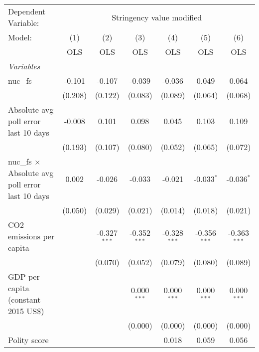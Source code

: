 
\begingroup
\centering
\begin{tabular}{lcccccc}
   \toprule
   Dependent Variable: & \multicolumn{6}{c}{Stringency value modified}\\
   Model:                                                  & (1)     & (2)            & (3)            & (4)            & (5)            & (6)\\  
                                                           &  OLS    & OLS            & OLS            & OLS            & OLS            & OLS\\  
   \midrule
   \emph{Variables}\\
   nuc\_fs                                                 & -0.101  & -0.107         & -0.039         & -0.036         & 0.049          & 0.064\\   
                                                           & (0.208) & (0.122)        & (0.083)        & (0.089)        & (0.064)        & (0.068)\\   
   Absolute avg poll error last 10 days                    & -0.008  & 0.101          & 0.098          & 0.045          & 0.103          & 0.109\\   
                                                           & (0.193) & (0.107)        & (0.080)        & (0.052)        & (0.065)        & (0.072)\\   
   nuc\_fs $\times$ Absolute avg poll error last 10 days   & 0.002   & -0.026         & -0.033         & -0.021         & -0.033$^{*}$   & -0.036$^{*}$\\   
                                                           & (0.050) & (0.029)        & (0.021)        & (0.014)        & (0.018)        & (0.021)\\   
   CO2 emissions per capita                                &         & -0.327$^{***}$ & -0.352$^{***}$ & -0.328$^{***}$ & -0.356$^{***}$ & -0.363$^{***}$\\   
                                                           &         & (0.070)        & (0.052)        & (0.079)        & (0.080)        & (0.089)\\   
   GDP per capita (constant 2015 US\$)                     &         &                & 0.000$^{***}$  & 0.000$^{***}$  & 0.000$^{***}$  & 0.000$^{***}$\\   
                                                           &         &                & (0.000)        & (0.000)        & (0.000)        & (0.000)\\   
   Polity score                                            &         &                &                & 0.018          & 0.059          & 0.056\\   

\end{tabular}
